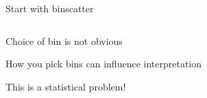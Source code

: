 \documentclass[notes,11pt, aspectratio=169]{beamer}
\newenvironment{wideitemize}{\itemize\addtolength{\itemsep}{10pt}}{\enditemize}
\begin{document}
\begin{frame}{Start with binscatter}
  \begin{columns}[T] %
    \begin{column}{.5\textwidth}
      \begin{wideitemize}
      \item<1-> Choice of bin is not obvious
      \item<1-> How you pick bins can influence interpretation
      \item<3-> This is a statistical problem! 
  \end{wideitemize}
  \end{column}%
  \hfill%
  \begin{column}{.5\textwidth}
\end{column}
\end{columns}
\end{frame}
\end{document}
